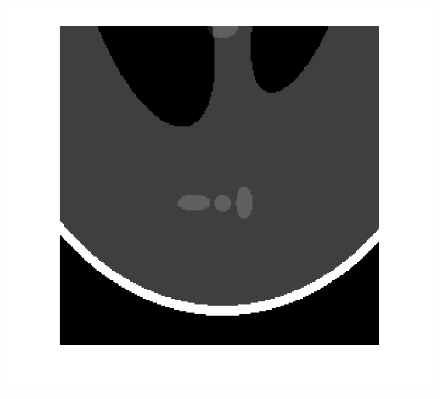 \documentclass[hyperref]{ctexart}
\begin{document}
{\begin{figure}[htbp]
{				\includegraphics[scale=0.2]{11-2.png}
			}
			\quad
			\quad
			\subfigure[pic1.]{
}
\end{figure}}
\end{document}
